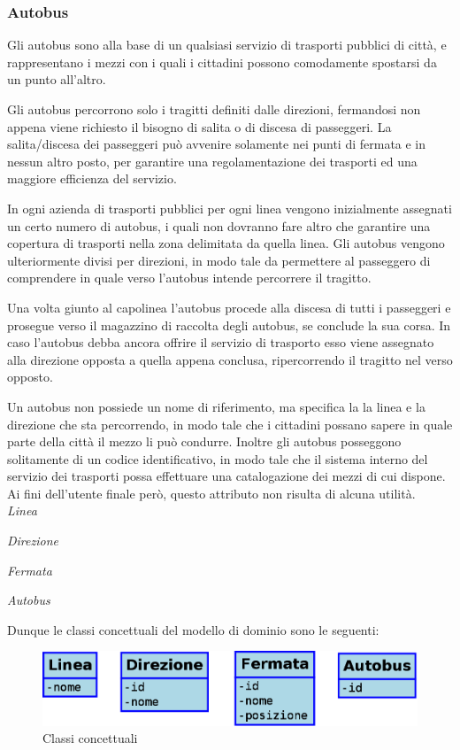 \subsubsection{Autobus} %
\label{ssub:autobus}
Gli autobus sono alla base di un qualsiasi servizio di trasporti pubblici di città, e rappresentano i mezzi con i quali i cittadini possono comodamente spostarsi da un punto all'altro.

Gli autobus percorrono solo i tragitti definiti dalle direzioni, fermandosi non appena viene richiesto il bisogno di salita o di discesa di passeggeri. La salita/discesa dei passeggeri può avvenire solamente nei punti di fermata e in nessun altro posto, per garantire una regolamentazione dei trasporti ed una maggiore efficienza del servizio.

In ogni azienda di trasporti pubblici per ogni linea vengono inizialmente assegnati un certo numero di autobus, i quali non dovranno fare altro che garantire una copertura di trasporti nella zona delimitata da quella linea. Gli autobus vengono ulteriormente divisi per direzioni, in modo tale da permettere al passeggero di comprendere in quale verso l'autobus intende percorrere il tragitto.

Una volta giunto al capolinea l'autobus procede alla discesa di tutti i passeggeri e prosegue verso il magazzino di raccolta degli autobus, se conclude la sua corsa. In caso l'autobus debba ancora offrire il servizio di trasporto esso viene assegnato alla direzione opposta a quella appena conclusa, ripercorrendo il tragitto nel verso opposto.

Un autobus non possiede un nome di riferimento, ma specifica la la linea e la direzione che sta percorrendo, in modo tale che i cittadini possano sapere in quale parte della città il mezzo li può condurre.
Inoltre gli autobus posseggono solitamente di un codice identificativo, in modo tale che il sistema interno del servizio dei trasporti possa effettuare una catalogazione dei mezzi di cui dispone. Ai fini dell'utente finale però, questo attributo non risulta di alcuna utilità.\\

{\itshape Linea}

{\itshape Direzione}

{\itshape Fermata}

{\itshape Autobus}



Dunque le classi concettuali del modello di dominio sono le seguenti:
\vspace{1cm}
\begin{figure}[htbp]
\begin{center}
\includegraphics[width=12cm]{contents/images/classi_concettuali}
\end{center}
\caption{Classi concettuali}
\label{fig:classes}
\end{figure}

